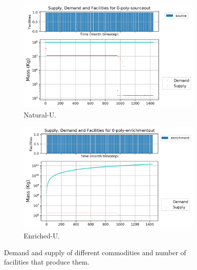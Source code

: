 \documentclass[11pt]{article}
\begin{document}
\begin{figure}[H]
	\centering
	\begin{subfigure}[]{0.45\textwidth}
		\centering
		\includegraphics[width=\linewidth]{29-figures/0-poly-sourceout.png} 
		\caption{Natural-U.}
		\label{fig:29-sourceout}
	\end{subfigure}
	\vspace{1cm}
	\begin{subfigure}[]{0.45\textwidth}
		\centering
		\includegraphics[width=\linewidth]{29-figures/0-poly-enrichmentout.png} 
		\caption{Enriched-U.}
		\label{fig:29-enrichmentout}
	\end{subfigure}
	\hfill
	\caption{Demand and supply of different commodities and number of facilities that produce them.}
	\label{fig:29-front}
\end{figure}
\end{document}
